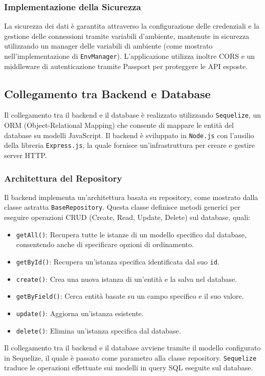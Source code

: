 \documentclass[twoside]{supsistudent}
\begin{document}
\subsubsection{Implementazione della Sicurezza}
La sicurezza dei dati è garantita attraverso la configurazione delle credenziali e la gestione delle connessioni tramite variabili d'ambiente, mantenute in sicurezza utilizzando un manager delle variabili di ambiente (come mostrato nell'implementazione di \texttt{EnvManager}\cite{create-react-app}). L'applicazione utilizza inoltre CORS e un middleware di autenticazione tramite Passport per proteggere le API esposte.

\subsection{Collegamento tra Backend e Database}
Il collegamento tra il backend e il database è realizzato utilizzando \texttt{Sequelize}, un ORM (Object-Relational Mapping) che consente di mappare le entità del database su modelli JavaScript. Il backend è sviluppato in \texttt{Node.js} con l'ausilio della libreria \texttt{Express.js}, la quale fornisce un'infrastruttura per creare e gestire server HTTP.

\subsubsection{Architettura del Repository}
Il backend implementa un'architettura basata su repository, come mostrato dalla classe astratta \texttt{BaseRepository}. Questa classe definisce metodi generici per eseguire operazioni CRUD (Create, Read, Update, Delete) sul database, quali:
\begin{itemize}
  \item \texttt{getAll()}: Recupera tutte le istanze di un modello specifico dal database, consentendo anche di specificare opzioni di ordinamento.
  \item \texttt{getById()}: Recupera un'istanza specifica identificata dal suo \texttt{id}.
  \item \texttt{create()}: Crea una nuova istanza di un'entità e la salva nel database.
  \item \texttt{getByField()}: Cerca entità basate su un campo specifico e il suo valore.
  \item \texttt{update()}: Aggiorna un'istanza esistente.
  \item \texttt{delete()}: Elimina un'istanza specifica dal database.
\end{itemize}
Il collegamento tra il backend e il database avviene tramite il modello configurato in Sequelize, il quale è passato come parametro alla classe repository. \texttt{Sequelize} traduce le operazioni effettuate sui modelli in query SQL eseguite sul database.
\end{document}
